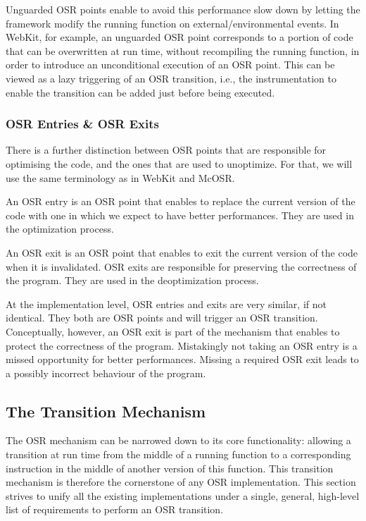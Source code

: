 Unguarded OSR points enable to avoid this performance slow down by letting the framework modify the running function on external/environmental events.
In WebKit\cite{WebKitURL}, for example, an unguarded OSR point corresponds to a portion of code that can be overwritten at run time, without recompiling the running function, in order to introduce an unconditional execution of an OSR point.
This can be viewed as a lazy triggering of an OSR transition, i.e., the instrumentation to enable the transition can be added just before being executed.\\

\subsubsection{OSR Entries \& OSR Exits}

There is a further distinction between OSR points that are responsible for optimising the code, and the ones that are used to unoptimize.
For that, we will use the same terminology as in WebKit\cite{WebKitURL} and McOSR\cite{lameed2013modular}.

\begin{definition}\label{OSREntryDefinition}
An OSR entry is an OSR point that enables to replace the current version of the code with one in which we expect to have better performances.
They are used in the optimization process.
\end{definition}

\begin{definition}
An OSR exit is an OSR point that enables to exit the current version of the code when it is invalidated.
OSR exits are responsible for preserving the correctness of the program.
They are used in the deoptimization process.
\end{definition}

At the implementation level, OSR entries and exits are very similar, if not identical. 
They both are OSR points and will trigger an OSR transition.
Conceptually, however, an OSR exit is part of the mechanism that enables to protect the correctness of the program.
Mistakingly not taking an OSR entry is a missed opportunity for better performances.
Missing a required OSR exit leads to a possibly incorrect behaviour of the program.\\

\subsection{The Transition Mechanism}
The OSR mechanism can be narrowed down to its core functionality: allowing a transition at run time from the middle of a running function to a corresponding instruction in the middle of another version of this function.
This transition mechanism is therefore the cornerstone of any OSR implementation.
This section strives to unify all the existing implementations under a single, general, high-level list of requirements to perform an OSR transition.\\

